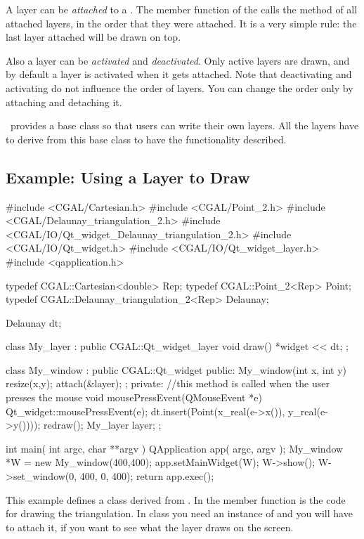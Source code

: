 A layer can be {\em attached} to a . The 
member function of the  calls
the method  of all attached layers, in the
order that they were attached. It is a very simple rule: the last layer
attached will be drawn on top.

Also a layer can be {\em activated} and {\em deactivated}. Only active
layers are drawn, and by default a layer is activated when it gets
attached.  Note that deactivating and activating do not influence the
order of layers. You can change the order only by attaching and
detaching it.


\cgal\ provides a base class so that users can write their own
layers. All the layers have to derive from this base class
 to have the functionality described.


\subsection{Example: Using a Layer to Draw}

\ccExample
\begin{ccExampleCode}
#include <CGAL/Cartesian.h>
#include <CGAL/Point_2.h>
#include <CGAL/Delaunay_triangulation_2.h>
#include <CGAL/IO/Qt_widget_Delaunay_triangulation_2.h>
#include <CGAL/IO/Qt_widget.h>
#include <CGAL/IO/Qt_widget_layer.h>
#include <qapplication.h>

typedef CGAL::Cartesian<double>             Rep;
typedef CGAL::Point_2<Rep>                  Point;
typedef CGAL::Delaunay_triangulation_2<Rep> Delaunay;

Delaunay dt;

class My_layer : public CGAL::Qt_widget_layer{
  void draw(){
    *widget << dt;
  }
};

class My_window : public CGAL::Qt_widget {
public:
  My_window(int x, int y)
  {
    resize(x,y);
    attach(&layer);
  };
private:
  //this method is called when the user presses the mouse
  void mousePressEvent(QMouseEvent *e)
  {
    Qt_widget::mousePressEvent(e);
    dt.insert(Point(x_real(e->x()), y_real(e->y())));
    redraw();
  }
  My_layer layer;
};

int main( int argc, char **argv )
{
    QApplication app( argc, argv );
    My_window *W = new My_window(400,400);
    app.setMainWidget(W);
    W->show();
    W->set_window(0, 400, 0, 400);
    return app.exec();
}
\end{ccExampleCode}

This example defines a class derived from
. In the member function 
is the code for drawing the triangulation. In 
class you need an instance of  and you will 
have to attach it, if you want to see what the layer draws on the
screen.

